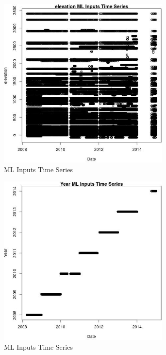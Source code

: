 \begin{figure} 
\centering  
\includegraphics[width=0.77\textwidth]{Code_Outputs/Report_ML_input_PM25_Step4_part_e_de_duplicated_aves_elevationvDate.jpg} 
\caption{\label{fig:Report_ML_input_PM25_Step4_part_e_de_duplicated_aveselevationvDate}ML Inputs Time Series} 
\end{figure} 
 

\clearpage 

\begin{figure} 
\centering  
\includegraphics[width=0.77\textwidth]{Code_Outputs/Report_ML_input_PM25_Step4_part_e_de_duplicated_aves_YearvDate.jpg} 
\caption{\label{fig:Report_ML_input_PM25_Step4_part_e_de_duplicated_avesYearvDate}ML Inputs Time Series} 
\end{figure} 
 

